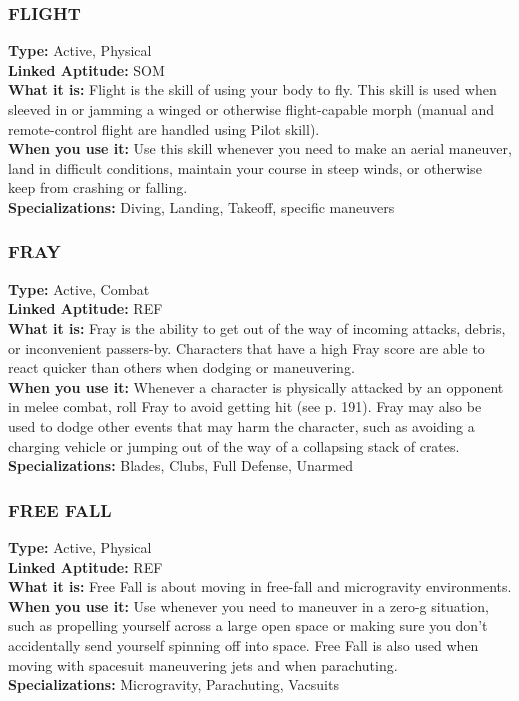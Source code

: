 \subsubsection{FLIGHT}
\textbf{Type:} Active, Physical
\\ \textbf{Linked Aptitude:} SOM
\\ \textbf{What it is:} Flight is the skill of using your body to
fly. This skill is used when sleeved in or jamming a
winged or otherwise flight-capable morph (manual and
remote-control flight are handled using Pilot skill).
\\ \textbf{When you use it:} Use this skill whenever you need to
make an aerial maneuver, land in difficult conditions,
maintain your course in steep winds, or otherwise
keep from crashing or falling.
\\ \textbf{Specializations:} Diving, Landing, Takeoff, specific
maneuvers

\subsubsection{FRAY}
\textbf{Type:} Active, Combat
\\ \textbf{Linked Aptitude:} REF
\\ \textbf{What it is:} Fray is the ability to get out of the way
of incoming attacks, debris, or inconvenient passers-by.
Characters that have a high Fray score are able to react
quicker than others when dodging or maneuvering.
\\ \textbf{When you use it:} Whenever a character is physically
attacked by an opponent in melee combat, roll Fray to
avoid getting hit (see p. 191). Fray may also be used
to dodge other events that may harm the character,
such as avoiding a charging vehicle or jumping out of
the way of a collapsing stack of crates.
\\ \textbf{Specializations:} Blades, Clubs, Full Defense, Unarmed

\subsubsection{FREE FALL}
\textbf{Type:} Active, Physical
\\ \textbf{Linked Aptitude:} REF
\\ \textbf{What it is:} Free Fall is about moving in free-fall and
microgravity environments.
\\ \textbf{When you use it:} Use whenever you need to maneuver in a zero-g situation, such as propelling yourself
across a large open space or making sure you don’t
accidentally send yourself spinning off into space.
Free Fall is also used when moving with spacesuit
maneuvering jets and when parachuting.
\\ \textbf{Specializations:} Microgravity, Parachuting, Vacsuits

